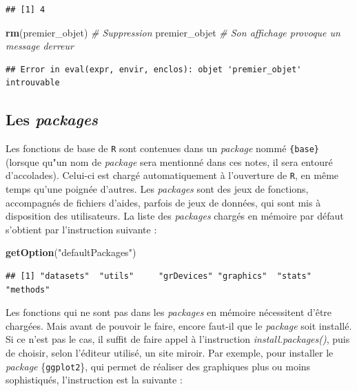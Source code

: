 \documentclass[
  11pt,
]{book}
\newenvironment{Shaded}{\begin{snugshade}}{\end{snugshade}}
\newcommand{\CommentTok}[1]{\textcolor[rgb]{0.56,0.35,0.01}{\textit{#1}}}
\newcommand{\KeywordTok}[1]{\textcolor[rgb]{0.13,0.29,0.53}{\textbf{#1}}}
\newcommand{\NormalTok}[1]{#1}
\newcommand{\StringTok}[1]{\textcolor[rgb]{0.31,0.60,0.02}{#1}}
\numberwithin{equation}{section}
\numberwithin{countremarque}{section}
\begin{document}
\begin{lstlisting}
## [1] 4
\end{lstlisting}

\begin{Shaded}
\begin{Highlighting}[]
\KeywordTok{rm}\NormalTok{(premier\_objet) }\CommentTok{\# Suppression}
\NormalTok{premier\_objet }\CommentTok{\# Son affichage provoque un message d\textquotesingle{}erreur}
\end{Highlighting}
\end{Shaded}

\begin{lstlisting}
## Error in eval(expr, envir, enclos): objet 'premier_objet' introuvable
\end{lstlisting}

\hypertarget{les-packages}{%
\subsection{\texorpdfstring{Les \emph{packages}}{Les packages}}\label{les-packages}}

Les fonctions de base de \texttt{R} sont contenues dans un \emph{package} nommé \texttt{\{base\}} (lorsque qu"un nom de \emph{package} sera mentionné dans ces notes, il sera entouré d'accolades). Celui-ci est chargé automatiquement à l'ouverture de \texttt{R}, en même temps qu'une poignée d'autres. Les \emph{packages} sont des jeux de fonctions, accompagnés de fichiers d'aides, parfois de jeux de données, qui sont mis à disposition des utilisateurs. La liste des \emph{packages} chargés en mémoire par défaut s'obtient par l'instruction suivante :

\begin{Shaded}
\begin{Highlighting}[]
\KeywordTok{getOption}\NormalTok{(}\StringTok{"defaultPackages"}\NormalTok{)}
\end{Highlighting}
\end{Shaded}

\begin{lstlisting}
## [1] "datasets"  "utils"     "grDevices" "graphics"  "stats"     "methods"
\end{lstlisting}

Les fonctions qui ne sont pas dans les \emph{packages} en mémoire nécessitent d'être chargées. Mais avant de pouvoir le faire, encore faut-il que le \emph{package} soit installé. Si ce n'est pas le cas, il suffit de faire appel à l'instruction \emph{install.packages()}, puis de choisir, selon l'éditeur utilisé, un site miroir. Par exemple, pour installer le \emph{package} \{\texttt{ggplot2}\}, qui permet de réaliser des graphiques plus ou moins sophistiqués, l'instruction est la suivante :
\end{document}
